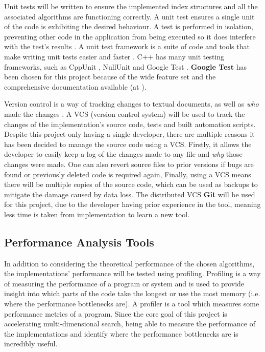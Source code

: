 Unit tests will be written to ensure the implemented index structures and all the associated algorithms are functioning correctly. A unit test ensures a single unit of the code is exhibiting the desired behaviour. A test is performed in isolation, preventing other code in the application from being executed so it does interfere with the test's results \cite{automated-defect-prevention}. A unit test framework is a suite of code and tools that make writing unit tests easier and faster \cite{unit-test-frameworks}. C++ has many unit testing frameworks, such as CppUnit \cite{cppunit}, NullUnit \cite{nullunit} and Google Test \cite{google-test}. \textbf{Google Test} has been chosen for this project because of the wide feature set and the comprehensive documentation available (at \cite{google-test}).

Version control is a way of tracking changes to textual documents, as well as \textit{who} made the changes \cite{pragmatic-version-control}. A VCS (version control system) will be used to track the changes of the implementation's source code, tests and built automation scripts. Despite this project only having a single developer, there are multiple reasons it has been decided to manage the source code using a VCS. Firstly, it allows the developer to easily keep a log of the changes made to any file and \textit{why} those changes were made. One can also revert source files to prior versions if bugs are found or previously deleted code is required again, Finally, using a VCS means there will be multiple copies of the source code, which can be used as backups to mitigate the damage caused by data loss. The distributed VCS \textbf{Git} \cite{git} will be used for this project, due to the developer having prior experience in the tool, meaning less time is taken from implementation to learn a new tool.

\subsection{Performance Analysis Tools}

In addition to considering the theoretical performance of the chosen algorithms, the implementations' performance will be tested using profiling. Profiling is a way of measuring the performance of a program or system \cite{efficient-cpp} and is used to provide insight into which parts of the code take the longest or use the most memory (i.e. where the performance bottlenecks are). A profiler is a tool which measures some performance metrics of a program. Since the core goal of this project is accelerating multi-dimensional search, being able to measure the performance of the implementations and identify where the performance bottlenecks are is incredibly useful.

